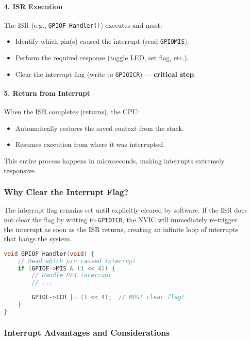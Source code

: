 \paragraph{4. ISR Execution}
The ISR (e.g., \texttt{GPIOF\_Handler()}) executes and must:
\begin{itemize}[nosep]
  \item Identify which pin(s) caused the interrupt (read \texttt{GPIOMIS}).
  \item Perform the required response (toggle LED, set flag, etc.).
  \item Clear the interrupt flag (write to \texttt{GPIOICR}) — \textbf{critical step}.
\end{itemize}

\paragraph{5. Return from Interrupt}
When the ISR completes (returns), the CPU:
\begin{itemize}[nosep]
  \item Automatically restores the saved context from the stack.
  \item Resumes execution from where it was interrupted.
\end{itemize}

\noindent
This entire process happens in microseconds, making interrupts extremely responsive.

\subsubsection{Why Clear the Interrupt Flag?}

The interrupt flag remains set until explicitly cleared by software. If the ISR does not clear the flag by writing to \texttt{GPIOICR}, the NVIC will immediately re-trigger the interrupt as soon as the ISR returns, creating an infinite loop of interrupts that hangs the system.

\begin{lstlisting}[caption={Critical: Always clear the interrupt flag}, language=C]
void GPIOF_Handler(void) {
    // Read which pin caused interrupt
    if (GPIOF->MIS & (1 << 4)) {
        // Handle PF4 interrupt
        // ...
        
        GPIOF->ICR |= (1 << 4);  // MUST clear flag!
    }
}
\end{lstlisting}

\subsubsection{Interrupt Advantages and Considerations}

